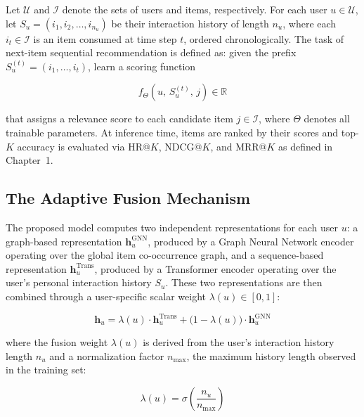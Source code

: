 \documentclass[12pt,a4paper]{report}
\begin{document}
Let \(\mathcal{U}\) and \(\mathcal{I}\) denote the sets of users and items,
respectively. For each user \(u \in \mathcal{U}\), let
\(S_u = (i_1, i_2, \ldots, i_{n_u})\) be their interaction history of length
\(n_u\), where each \(i_t \in \mathcal{I}\) is an item consumed at time step
\(t\), ordered chronologically. The task of next-item sequential recommendation
is defined as: given the prefix \(S_u^{(t)} = (i_1, \ldots, i_t)\), learn a
scoring function

\begin{equation}
    f_{\Theta}\!\left(u,\, S_u^{(t)},\, j\right) \in \mathbb{R}
    \label{eq:scoring}
\end{equation}

\noindent that assigns a relevance score to each candidate item
\(j \in \mathcal{I}\), where \(\Theta\) denotes all trainable parameters. At
inference time, items are ranked by their scores and top-\(K\) accuracy is
evaluated via HR@\(K\), NDCG@\(K\), and MRR@\(K\) as defined in
Chapter~1.

\subsection{The Adaptive Fusion Mechanism}

The proposed model computes two independent representations for each user
\(u\): a graph-based representation \(\mathbf{h}_u^{\text{GNN}}\), produced by
a Graph Neural Network encoder operating over the global item co-occurrence
graph, and a sequence-based representation \(\mathbf{h}_u^{\text{Trans}}\),
produced by a Transformer encoder operating over the user's personal
interaction history \(S_u\). These two representations are then combined
through a user-specific scalar weight \(\lambda(u) \in [0, 1]\):

\begin{equation}
    \mathbf{h}_u = \lambda(u)\cdot \mathbf{h}_u^{\text{Trans}}
    + \bigl(1 - \lambda(u)\bigr)\cdot \mathbf{h}_u^{\text{GNN}}
    \label{eq:fusion}
\end{equation}

\noindent where the fusion weight \(\lambda(u)\) is derived from the user's
interaction history length \(n_u\) and a normalization factor \(n_{\max}\),
the maximum history length observed in the training set:

\begin{equation}
    \lambda(u) = \sigma\!\left(\frac{n_u}{n_{\max}}\right)
    \label{eq:lambda}
\end{equation}
\end{document}
